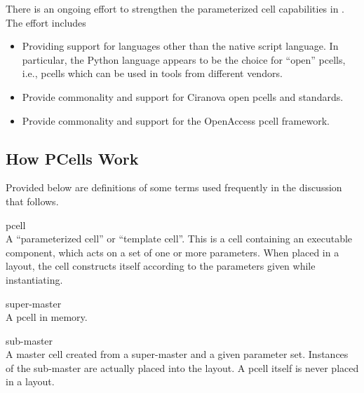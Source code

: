 There is an ongoing effort to strengthen the parameterized
cell capabilities in {\Xic}.  The effort includes
\begin{itemize}
\item{Providing support for languages other than the native script
language.  In particular, the Python language appears to be the choice
for ``open'' pcells, i.e., pcells which can be used in tools from
different vendors.}

\item{Provide commonality and support for Ciranova open pcells and
standards.}

\item{Provide commonality and support for the OpenAccess pcell
framework.}
\end{itemize}
%

\subsection{How PCells Work}

Provided below are definitions of some terms used frequently in the
discussion that follows.
\begin{description}
\item{\et pcell}\\
A ``parameterized cell'' or ``template cell''.  This is a cell
containing an executable component, which acts on a set of one or more
parameters.  When placed in a layout, the cell constructs itself
according to the parameters given while instantiating.

\item{\et super-master}\\
A {\et pcell} in memory.

\item{\et sub-master}\\
A master cell created from a {\et super-master} and a given parameter
set.  Instances of the sub-master are actually placed into the layout. 
A {\et pcell} itself is never placed in a layout.
\end{description}

